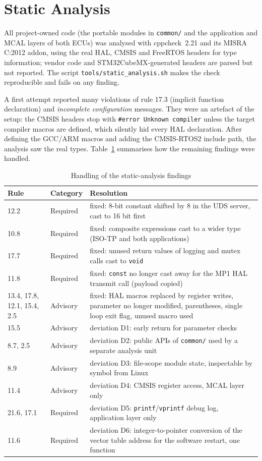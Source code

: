 \section{Static Analysis}

All project-owned code (the portable modules in \texttt{common/} and the application and MCAL layers of both ECUs) was analysed with cppcheck~2.21 and its MISRA C:2012 addon, using the real HAL, CMSIS and FreeRTOS headers for type information; vendor code and STM32CubeMX-generated headers are parsed but not reported. The script \texttt{tools/static\_analysis.sh} makes the check reproducible and fails on any finding.

A first attempt reported many violations of rule 17.3 (implicit function declaration) and \textit{incomplete configuration} messages. They were an artefact of the setup: the CMSIS headers stop with \texttt{\#error Unknown compiler} unless the target compiler macros are defined, which silently hid every HAL declaration. After defining the GCC/ARM macros and adding the CMSIS-RTOS2 include path, the analysis saw the real types. Table~\ref{tab:misra} summarises how the remaining findings were handled.

\begin{table}[H]
\centering
\small
\caption{Handling of the static-analysis findings}
\label{tab:misra}
\begin{tabularx}{\textwidth}{@{}llX@{}}
\toprule
\textbf{Rule} & \textbf{Category} & \textbf{Resolution} \\
\midrule
12.2 & Required & fixed: 8-bit constant shifted by 8 in the UDS server, cast to 16 bit first \\
10.8 & Required & fixed: composite expressions cast to a wider type (ISO-TP and both applications) \\
17.7 & Required & fixed: unused return values of logging and mutex calls cast to \texttt{void} \\
11.8 & Required & fixed: \texttt{const} no longer cast away for the MP1 HAL transmit call (payload copied) \\
13.4, 17.8, 12.1, 15.4, 2.5 & Advisory & fixed: HAL macros replaced by register writes, parameter no longer modified, parentheses, single loop exit flag, unused macro used \\
15.5 & Advisory & deviation D1: early return for parameter checks \\
8.7, 2.5 & Advisory & deviation D2: public APIs of \texttt{common/} used by a separate analysis unit \\
8.9 & Advisory & deviation D3: file-scope module state, inspectable by symbol from Linux \\
11.4 & Advisory & deviation D4: CMSIS register access, MCAL layer only \\
21.6, 17.1 & Required & deviation D5: \texttt{printf}/\texttt{vprintf} debug log, application layer only \\
11.6 & Required & deviation D6: integer-to-pointer conversion of the vector table address for the software restart, one function \\
\bottomrule
\end{tabularx}
\end{table}

